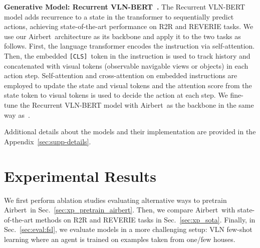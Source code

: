 \RequirePackage[dvipsnames,table]{xcolor} \documentclass[10pt,twocolumn,letterpaper]{article}
\newcommand{\p}[1]{\vspace{1mm}\noindent\textbf{#1}}
\newcommand{\airbert}{Airbert}
\newcommand{\cls}{\texttt{[CLS]}}
\begin{document}
\p{Generative Model: Recurrent VLN-BERT~\cite{hong2021recurrentvln}.}
The Recurrent VLN-BERT model adds recurrence to a state in the transformer to sequentially predict actions, achieving state-of-the-art performance on R2R and REVERIE tasks.
We use our \airbert~architecture as its backbone and apply it to the two tasks as follows.
First, the language transformer encodes the instruction via self-attention.
Then, the embedded \cls~token in the instruction is used to track history and concatenated with visual tokens (observable navigable views or objects) in each action step.
Self-attention and cross-attention on embedded instructions are employed to update the state and visual tokens and the attention score from the state token to visual tokens is used to decide the action at each step.
We fine-tune the Recurrent VLN-BERT model with \airbert~as the backbone in the same way as~\cite{hong2021recurrentvln}.

Additional details about the models and their implementation are provided in the Appendix~\ref{sec:supp-details}.

 \section{Experimental Results}
\label{sec:xp}

We first perform ablation studies evaluating alternative ways to pretrain \airbert~in Sec.~\ref{sec:xp_pretrain_airbert}.
Then, we compare \airbert~with state-of-the-art methods on R2R and REVERIE tasks in Sec.~\ref{sec:xp_sota}.
Finally, in Sec.~\ref{sec:eval:fsl}, we evaluate models in a more challenging setup: VLN few-shot learning where an agent is trained on examples taken from one/few houses.
\end{document}
